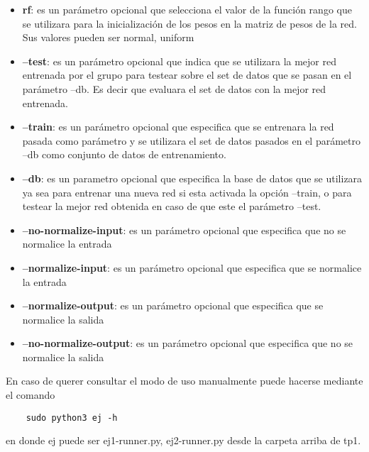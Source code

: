 \begin{itemize}
  \item \textbf{rf}: es un parámetro opcional que selecciona el valor de la función rango que se utilizara para la inicialización de los pesos en la matriz de pesos de la red.
            Sus valores pueden ser {normal, uniform}
  \item \textbf{--test}: es un parámetro opcional que indica que se utilizara la mejor red entrenada por el grupo para testear sobre el set de datos que se pasan en el parámetro
                        --db. Es decir que evaluara el set de datos con la mejor red entrenada.
  \item \textbf{--train}: es un parámetro opcional que especifica que se entrenara la red pasada como parámetro y se utilizara el set de datos pasados en el parámetro --db
                        como conjunto de datos de entrenamiento.
  \item \textbf{--db}: es un parametro opcional que especifica la base de datos que se utilizara ya sea para entrenar una nueva red si esta activada la opción --train, o
                        para testear la mejor red obtenida en caso de que este el parámetro --test.
  \item \textbf{--no-normalize-input}: es un parámetro opcional que especifica que no se normalice la entrada
  \item \textbf{--normalize-input}: es un parámetro opcional que especifica que se normalice la entrada
  \item \textbf{--normalize-output}: es un parámetro opcional que especifica que se normalice la salida
  \item \textbf{--no-normalize-output}: es un parámetro opcional que especifica que no se normalice la salida
\end{itemize}

En caso de querer consultar el modo de uso manualmente puede hacerse mediante el comando
\begin{verbatim}
    sudo python3 ej -h
\end{verbatim}
en donde ej puede ser {ej1-runner.py, ej2-runner.py} desde la carpeta arriba de tp1.
%

\newpage
